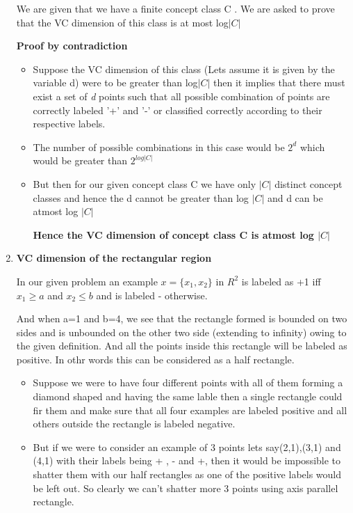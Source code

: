 \documentclass[12pt, fullpage,letterpaper]{article}
\begin{document}
\begin{enumerate}
	We are given that we have a finite concept class C . We are asked to prove that the VC dimension of this class is at most log$|C|$
	
	\textbf{Proof by contradiction}
	
	\begin{itemize}
		
	\item Suppose the VC dimension of this class (Lets assume it is given by the variable d) were to be greater than log$|C| $ then it implies that there must exist a set of \emph{d} points such that all possible combination of points are correctly labeled '+' and '-' or classified correctly according to their respective labels. 
	
	\item The number of possible combinations in this case would be $2^d$ which would be greater than $2^{log|C|}$
	
	\item But then for our given concept class C we have only $|C|$ distinct concept classes and hence the d cannot be greater than log $|C|$ and d can be atmost  log $|C|$
	
	\textbf {Hence the VC dimension of concept class C is atmost log $|C|$}
	
		\end{itemize}
	
	\item \textbf{ VC dimension of the rectangular region}
	
	In our given problem an example $x=\{x_1,x_2\} $ in $R^2$ is labeled as +1 iff $x_1 \geq a$ and $x_2 \leq b$ and is labeled - otherwise. 
	
And when a=1 and b=4, we see that the rectangle formed is bounded on two sides and is unbounded on the other two side (extending to infinity) owing to the given definition. And all the points inside this rectangle will be labeled as positive. In othr words this can be considered as a half rectangle.
\begin{itemize}
\item Suppose we were to have four different points with all of them forming a diamond shaped and having the same lable then a single rectangle could fir them and make sure that all four examples are labeled positive and all others outside the rectangle is labeled negative.

\item But if we were to consider an example of 3 points lets say(2,1),(3,1) and (4,1) with their labels being + , - and +, then it would be impossible to shatter them with our   half  rectangles as one of the positive labels would be left out. So clearly we can't shatter more 3 points using axis parallel rectangle.


\end{itemize}
\end{enumerate}
\end{document}
